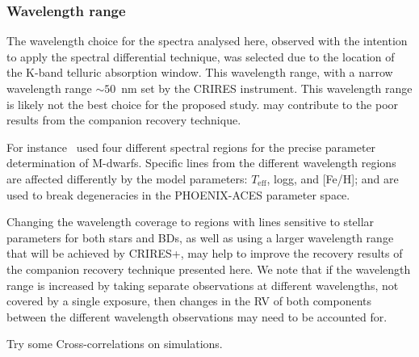 \subsubsection {Wavelength range}
The wavelength choice for the spectra analysed here, observed with the intention to apply the spectral differential technique, was selected due to the location of the K-band telluric absorption window. This wavelength range, with a narrow wavelength range \(\sim50\)~nm set by the CRIRES instrument. This wavelength range is likely not the best choice for the proposed study. may contribute to the poor results from the companion recovery technique. 

For instance~\citet{passegger_fundamental_2016} used four different spectral regions for the precise parameter determination of M-dwarfs. Specific lines from the different wavelength regions are affected differently by the model parameters: \(T_{\textrm{eff}}\), logg, and [Fe/H]; and are used to break degeneracies in the PHOENIX-ACES parameter space. 

Changing the wavelength coverage to regions with lines sensitive to stellar parameters for both stars and BDs, as well as using a larger wavelength range that will be achieved by CRIRES+, may help to improve the recovery results of the companion recovery technique presented here. We note that if the wavelength range is increased by taking separate observations at different wavelengths, not covered by a single exposure, then changes in the RV of both components between the different wavelength observations may need to be accounted for. 







Try some Cross-correlations on simulations.


